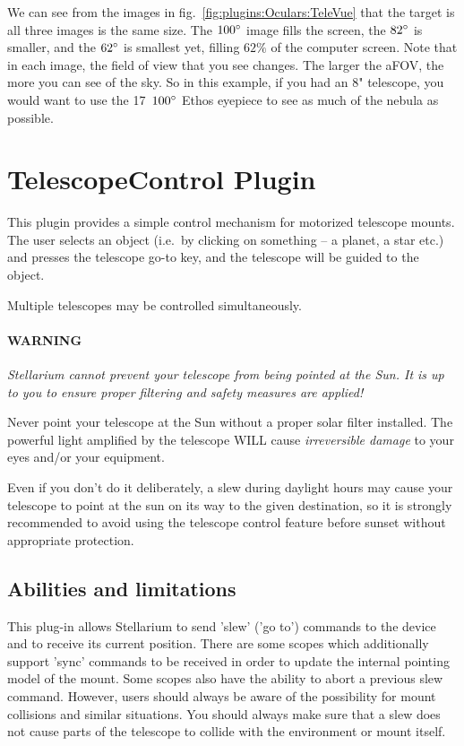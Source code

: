 We can see from the images in fig.~\ref{fig:plugins:Oculars:TeleVue}
that the target is all three images is the same size. The $100\degree$ image fills the screen, 
the $82\degree$ is smaller, and the $62\degree$ is smallest yet, filling $62\%$ of the computer screen. 
Note that in each image, the field of view that you see changes. The larger the aFOV, the more you can see of the sky. 
So in this example, if you had an 8" telescope, you would want to use the 17\mm\ $100\degree$ Ethos eyepiece to see as much of the nebula as possible.

\newpage
\section{TelescopeControl Plugin}
\label{sec:plugins:TelescopeControl}

This plugin provides a simple control mechanism for motorized
telescope mounts. The user selects an object (i.e.\ by clicking on
something -- a planet, a star etc.) and presses the telescope go-to
key, and the telescope will be guided to the object.

Multiple telescopes may be controlled simultaneously. 

\paragraph{WARNING}\emph{Stellarium cannot prevent your
telescope from being pointed at the Sun. It is up to you to ensure
proper filtering and safety measures are applied!}

Never point your telescope at the Sun without a proper solar filter
installed. The powerful light amplified by the telescope WILL cause
\emph{irreversible damage} to your eyes and/or your equipment.

Even if you don't do it deliberately, a slew during daylight hours may
cause your telescope to point at the sun on its way to the given
destination, so it is strongly recommended to avoid using the
telescope control feature before sunset without appropriate
protection.



\subsection{Abilities and limitations}
\label{sec:plugins:TelescopeControl:Limitations}

This plug-in allows Stellarium to send 'slew' ('go to') commands
to the device and to receive its current position. There are some scopes which
additionally support 'sync' commands to be received in order to update the internal
pointing model of the mount. Some scopes also have the ability to abort a previous 
slew command. However, users should always be aware of the possibility for mount 
collisions and similar situations. You should always make sure that a slew does 
not cause parts of the telescope to collide with the environment or mount itself. 


